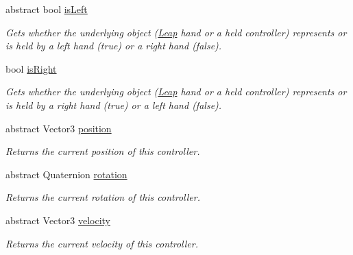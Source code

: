 \begin{DoxyCompactItemize}
abstract bool \mbox{\hyperlink{class_leap_1_1_unity_1_1_interaction_1_1_interaction_controller_ae14f805d22faabfecf3c6b818e97374a}{is\+Left}}
\begin{DoxyCompactList}\small\item\em Gets whether the underlying object (\mbox{\hyperlink{namespace_leap_1_1_unity_1_1_leap}{Leap}} hand or a held controller) represents or is held by a left hand (true) or a right hand (false). \end{DoxyCompactList}\item 
bool \mbox{\hyperlink{class_leap_1_1_unity_1_1_interaction_1_1_interaction_controller_af27c573638d3cb8b5886f0f6b12347d9}{is\+Right}}
\begin{DoxyCompactList}\small\item\em Gets whether the underlying object (\mbox{\hyperlink{namespace_leap_1_1_unity_1_1_leap}{Leap}} hand or a held controller) represents or is held by a right hand (true) or a left hand (false). \end{DoxyCompactList}\item 
abstract Vector3 \mbox{\hyperlink{class_leap_1_1_unity_1_1_interaction_1_1_interaction_controller_ae76036f3e88ac60d8fcaaf5496963773}{position}}
\begin{DoxyCompactList}\small\item\em Returns the current position of this controller. \end{DoxyCompactList}\item 
abstract Quaternion \mbox{\hyperlink{class_leap_1_1_unity_1_1_interaction_1_1_interaction_controller_a783f8f2327ab0ef060ac319153883dba}{rotation}}
\begin{DoxyCompactList}\small\item\em Returns the current rotation of this controller. \end{DoxyCompactList}\item 
abstract Vector3 \mbox{\hyperlink{class_leap_1_1_unity_1_1_interaction_1_1_interaction_controller_a33eaec5343487f2c11c8254c1e3b3d2f}{velocity}}
\begin{DoxyCompactList}\small\item\em Returns the current velocity of this controller. \end{DoxyCompactList}\item 

\end{DoxyCompactItemize}
